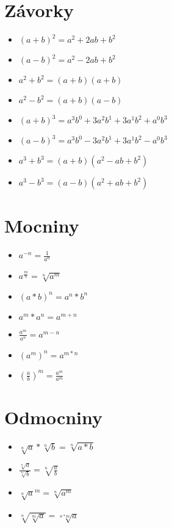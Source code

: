 \documentclass{article}
\begin{document}
	\section*{Závorky}
	\begin{multicols}{2}
		\begin{itemize}
			\item $(a+b)^2 =a^2 + 2ab + b^2$
			\item $(a-b)^2 =a^2 - 2ab + b^2$
			\item $a^2 + b^2=(a+b)(a+b)$
			\item $a^2 - b^2=(a+b)(a-b)$
	\columnbreak
			\item $(a+b)^3 =a^3 b^0 +3a^2 b^1 +3a^1 b^2 + a^0 b^3$
			\item $(a-b)^3 =a^3 b^0 -3a^2 b^1 +3a^1 b^2 - a^0 b^3$
			\item $a^3 + b^3 =(a+b)(a^2 - ab + b^2 )$
			\item $a^3 - b^3 =(a-b)(a^2 + ab + b^2 )$
		\end{itemize}
	\end{multicols}

	\section*{Mocniny}
	\begin{multicols}{2}
		\begin{itemize}
			\item $a^{-n}=\frac{1}{a^n}$
			\item $a^{\frac{m}{n}}=\sqrt[n]{a^m}$
			\item $(a*b)^n =a^n *b^n$
			\item $a^m * a^n = a^{m+n}$
		\columnbreak
			\item $\frac{a^m}{a^n}=a^{m-n}$
			\item $(a^m)^n = a^{m*n}$
			\item $\left(\frac{a}{b}\right)^m = \frac{a^m}{a^m}$
		\end{itemize}
	\end{multicols}

	\section*{Odmocniny}
	\begin{multicols}{2}
		\begin{itemize}
			\item $\sqrt[n]{a}*\sqrt[n]{b}=\sqrt[n]{a*b}$
			\item $\frac{\sqrt[n]{a}}{\sqrt[n]{b}}=\sqrt[n]{\frac{a}{b}}$
		\columnbreak
			\item $\sqrt[n]{a}^m =\sqrt[n]{a^m}$
			\item $\sqrt[n]{\sqrt[m]{a}}=\sqrt[n*m]{a}$
		\end{itemize}
	\end{multicols}
\end{document}
